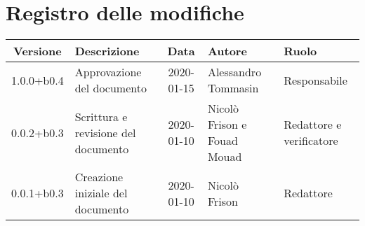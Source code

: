 \section*{Registro delle modifiche}

\begin{center}
	\begin{longtable}{|c|p{3.5cm}|c|p{3cm}|p{3cm}|}
	\hline
	\rowcolor{lighter-grayer}
	\textbf{Versione} & \textbf{Descrizione} & \textbf{Data} & \textbf{Autore} & \textbf{Ruolo} \\
	\hline
	\endfirsthead



	1.0.0+b0.4 & Approvazione del documento & 2020-01-15 & Alessandro Tommasin & Responsabile \\
	\hline
	0.0.2+b0.3 & Scrittura e revisione del documento & 2020-01-10 & Nicolò Frison e Fouad Mouad & Redattore e verificatore \\
	\hline
	0.0.1+b0.3 & Creazione iniziale del documento & 2020-01-10 & Nicolò Frison & Redattore \\
	\hline
	\end{longtable}
\end{center}